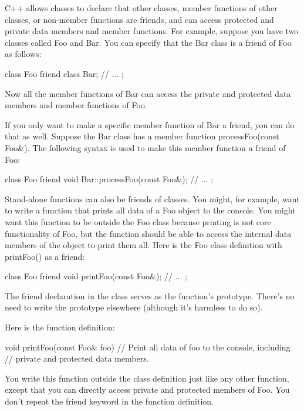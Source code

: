 C++ allows classes to declare that other classes, member functions of other classes, or non-member functions are friends, and can access protected and private data members and member functions. For example, suppose you have two classes called Foo and Bar. You can specify that the Bar class is a friend of Foo as follows:

\begin{cpp}
class Foo
{
    friend class Bar;
    // ...
};
\end{cpp}

Now all the member functions of Bar can access the private and protected data members and member functions of Foo.

If you only want to make a specific member function of Bar a friend, you can do that as well. Suppose the Bar class has a member function processFoo(const Foo\&). The following syntax is used to make this member function a friend of Foo:

\begin{cpp}
class Foo
{
    friend void Bar::processFoo(const Foo&);
    // ...
};
\end{cpp}

Stand-alone functions can also be friends of classes. You might, for example, want to write a function that prints all data of a Foo object to the console. You might want this function to be outside the Foo class because printing is not core functionality of Foo, but the function should be able to access the internal data members of the object to print them all. Here is the Foo class definition with printFoo() as a friend:

\begin{cpp}
class Foo
{
    friend void printFoo(const Foo&);
    // ...
};
\end{cpp}

The friend declaration in the class serves as the function’s prototype. There’s no need to write the prototype elsewhere (although it’s harmless to do so).

Here is the function definition:

\begin{cpp}
void printFoo(const Foo& foo)
{
    // Print all data of foo to the console, including
    // private and protected data members.
}
\end{cpp}

You write this function outside the class definition just like any other function, except that you can directly access private and protected members of Foo. You don’t repeat the friend keyword in the function definition.

